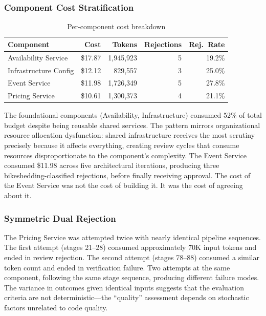 \documentclass[11pt,a4paper]{article}
\begin{document}
\subsubsection{Component Cost Stratification}

\begin{table}[H]
\centering
\caption{Per-component cost breakdown}
\label{tab:components}
\begin{tabular}{@{}lrrrr@{}}
\toprule
\textbf{Component} & \textbf{Cost} & \textbf{Tokens} & \textbf{Rejections} & \textbf{Rej.\ Rate} \\
\midrule
Availability Service & \$17.87 & 1,945,923 & 5 & 19.2\% \\
Infrastructure Config & \$12.12 & 829,557 & 3 & 25.0\% \\
Event Service & \$11.98 & 1,726,349 & 5 & 27.8\% \\
Pricing Service & \$10.61 & 1,300,373 & 4 & 21.1\% \\
\bottomrule
\end{tabular}
\end{table}

The foundational components (Availability, Infrastructure) consumed 52\% of total budget despite being reusable shared services. The pattern mirrors organizational resource allocation dysfunction: shared infrastructure receives the most scrutiny precisely because it affects everything, creating review cycles that consume resources disproportionate to the component's complexity. The Event Service consumed \$11.98 across five architectural iterations, producing three bikeshedding-classified rejections, before finally receiving approval. The cost of the Event Service was not the cost of building it. It was the cost of agreeing about it.

\subsubsection{Symmetric Dual Rejection}

The Pricing Service was attempted twice with nearly identical pipeline sequences. The first attempt (stages 21--28) consumed approximately 70K input tokens and ended in review rejection. The second attempt (stages 78--88) consumed a similar token count and ended in verification failure. Two attempts at the same component, following the same stage sequence, producing different failure modes. The variance in outcomes given identical inputs suggests that the evaluation criteria are not deterministic---the ``quality'' assessment depends on stochastic factors unrelated to code quality.
\end{document}
